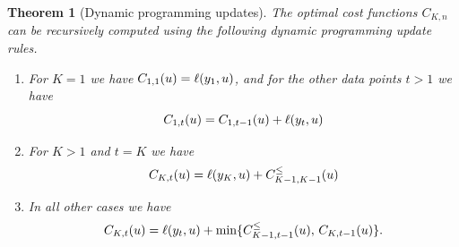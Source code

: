 \documentclass{article}
\newtheorem{theorem}{Theorem}
\begin{document}
\begin{theorem}[Dynamic programming updates]
  The optimal cost functions $C_{K,n}$ can be recursively computed using the
  following dynamic programming update rules.
\begin{enumerate}
\item For $K=1$ we have
$C_{1,1}(u)=\ell(y_1,u)$, and for the other data
  points $t>1$ we have
\begin{equation}
C_{1,t}(u)=C_{1,t-1}(u)+\ell(y_t,u)
\end{equation}
\item For $K>1$ and $t=K$ we have
\begin{equation}
  C_{K,t}(u)=\ell(y_K, u)+C_{K-1,K-1}^\leq(u)
\end{equation}
\item In all other cases we have
  \begin{equation}
  C_{K,t}(u)=\ell(y_t,u)+
  \min\{
  C_{K-1,t-1}^\leq(u),\,
  C_{K,t-1}(u)
  \}.
  \end{equation}
\end{enumerate}
\end{theorem}
\end{document}
